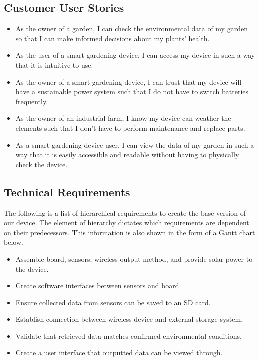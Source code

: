 \documentclass[IEEEtran,letterpaper,10pt,titlepage,fleqn,draftclsnofoot,onecolumn]{article}
\begin{document}
\subsection{Customer User Stories}

\begin{itemize}
  \item As the owner of a garden, I can check the environmental data of my garden so that I can make informed decisions about my plants’ health.
  \item As the user of a smart gardening device, I can access my device in such a way that it is intuitive to use.
  \item As the owner of a smart gardening device, I can trust that my device will have a sustainable power system such that I do not have to switch batteries frequently.
  \item As the owner of an industrial farm, I know my device can weather the elements such that I don’t have to perform maintenance and replace parts.
  \item As a smart gardening device user, I can view the data of my garden in such a way that it is easily accessible and readable without having to physically check the device.
\end{itemize}

\subsection{Technical Requirements}

The following is a list of hierarchical requirements to create the base version of our device. The element of hierarchy dictates which requirements are dependent on their predecessors. This information is also shown in the form of a Gantt chart below. 

\begin{itemize}
  \item Assemble board, sensors, wireless output method, and provide solar power to the device.
  \item Create software interfaces between sensors and board.
  \item Ensure collected data from sensors can be saved to an SD card.
  \item Establish connection between wireless device and external storage system.
  \item Validate that retrieved data matches confirmed environmental conditions.
  \item Create a user interface that outputted data can be viewed through.
\end{itemize}
\end{document}
